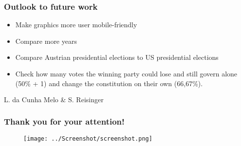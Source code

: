 \documentclass{beamer}
\begin{document}
\begin{frame}
\frametitle{Outlook to future work}
\begin{itemize}
\item Make graphics more user mobile-friendly 
\item Compare more years
\item Compare Austrian presidential elections to US presidential elections
\item Check how many votes the winning party could lose and still govern alone (50\% + 1) and change the constitution on their own (66,67\%).
\end{itemize}
\end{frame}

\begin{frame}
\centerline{L. da Cunha Melo \& S. Reisinger}
\frametitle{Thank you for your attention!}
\begin{figure}
    \centering
    \texttt{[image: ../Screenshot/screenshot.png]}
\end{figure}

\end{frame}

\end{document}
